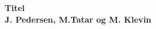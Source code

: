 \begin{titlepage}
   
   \begin{center}
   
      \Huge\textbf{Titel}
      \\
      \Large\textbf{J. Pedersen, M.Tatar og M. Klevin}
      	\begin{center}
       \end{center}   
   \end{center}
   \tableofcontents
   \thispagestyle{empty}
\end{titlepage}